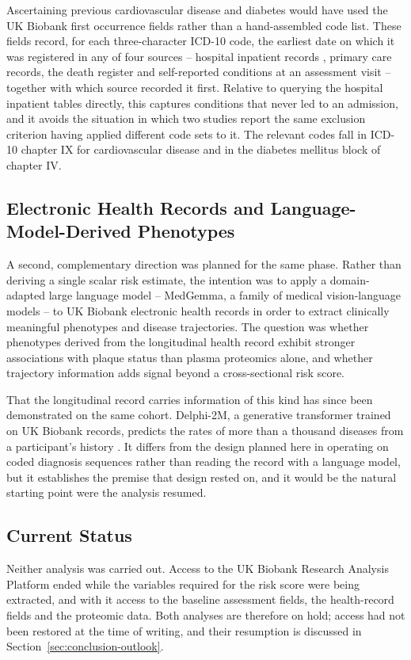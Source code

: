 Ascertaining previous cardiovascular disease and diabetes would have used the UK Biobank first
occurrence fields \cite{ukbiobank_firstocc} rather than a hand-assembled code list. These fields
record, for each three-character ICD-10 code, the earliest date on which it was registered in any
of four sources -- hospital inpatient records \cite{ukbiobank_hesin}, primary care records, the
death register and self-reported conditions at an assessment visit -- together with which source
recorded it first. Relative to querying the hospital inpatient tables directly, this captures
conditions that never led to an admission, and it avoids the situation in which two studies
report the same exclusion criterion having applied different code sets to it. The relevant codes
fall in ICD-10 chapter IX for cardiovascular disease and in the diabetes mellitus block of
chapter IV.

\subsection{Electronic Health Records and Language-Model-Derived Phenotypes}
\label{subsec:phase1b-ehr}
A second, complementary direction was planned for the same phase. Rather than deriving a single
scalar risk estimate, the intention was to apply a domain-adapted large language model --
MedGemma, a family of medical vision-language models \cite{sellergren2025medgemma} -- to UK
Biobank electronic health records in order to extract clinically meaningful phenotypes and
disease trajectories. The question was whether phenotypes derived from the longitudinal health
record exhibit stronger associations with plaque status than plasma proteomics alone, and whether
trajectory information adds signal beyond a cross-sectional risk score.

That the longitudinal record carries information of this kind has since been demonstrated on the
same cohort. Delphi-2M, a generative transformer trained on UK Biobank records, predicts the
rates of more than a thousand diseases from a participant's history \cite{shmatko2025delphi}. It
differs from the design planned here in operating on coded diagnosis sequences rather than
reading the record with a language model, but it establishes the premise that design rested on,
and it would be the natural starting point were the analysis resumed.

\subsection{Current Status}
\label{subsec:phase1b-discontinuation}
Neither analysis was carried out. Access to the UK Biobank Research Analysis Platform ended while
the variables required for the risk score were being extracted, and with it access to the
baseline assessment fields, the health-record fields and the proteomic data. Both analyses are
therefore on hold; access had not been restored at the time of writing, and their resumption is
discussed in Section~\ref{sec:conclusion-outlook}.


